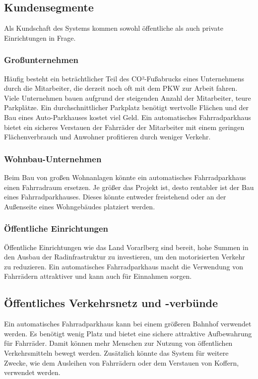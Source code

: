 \subsection{Kundensegmente}
Als Kundschaft des Systems kommen sowohl öffentliche als auch private Einrichtungen in Frage. \\

\subsubsection{Großunternehmen}
Häufig besteht ein beträchtlicher Teil des CO²-Fußabrucks eines Unternehmens durch die Mitarbeiter, die derzeit noch oft mit dem PKW zur Arbeit fahren. Viele Unternehmen bauen aufgrund der steigenden Anzahl der Mitarbeiter, teure Parkplätze. Ein durchschnittlicher Parkplatz benötigt wertvolle Flächen und der Bau eines Auto-Parkhauses kostet viel Geld. Ein automatisches Fahrradparkhaus bietet ein sicheres Verstauen der Fahrräder der Mitarbeiter mit einem geringen Flächenverbrauch und Anwohner profitieren durch weniger Verkehr.\\

\subsubsection{Wohnbau-Unternehmen}
Beim Bau von großen Wohnanlagen könnte ein automatisches Fahrradparkhaus einen Fahrradraum ersetzen. Je größer das Projekt ist, desto rentabler ist der Bau eines Fahrradparkhauses. Dieses könnte entweder freistehend oder an der Außenseite eines Wohngebäudes platziert werden.\\

\subsubsection{Öffentliche Einrichtungen}
Öffentliche Einrichtungen wie das Land Vorarlberg sind bereit, hohe Summen in den Ausbau der Radinfrastruktur zu investieren, um den motorisierten Verkehr zu reduzieren. Ein automatisches Fahrradparkhaus macht die Verwendung von Fahrrädern attraktiver und kann auch für Einnahmen sorgen.\\

\subsection{Öffentliches Verkehrsnetz und -verbünde}
Ein automatisches Fahrradparkhaus kann bei einem größeren Bahnhof verwendet werden. Es benötigt wenig Platz und bietet eine sichere attraktive Aufbewahrung für Fahrräder. Damit können mehr Menschen zur Nutzung von öffentlichen Verkehrsmitteln bewegt werden. Zusätzlich könnte das System für weitere Zwecke, wie dem Ausleihen von Fahrrädern oder dem Verstauen von Koffern, verwendet werden.\\


